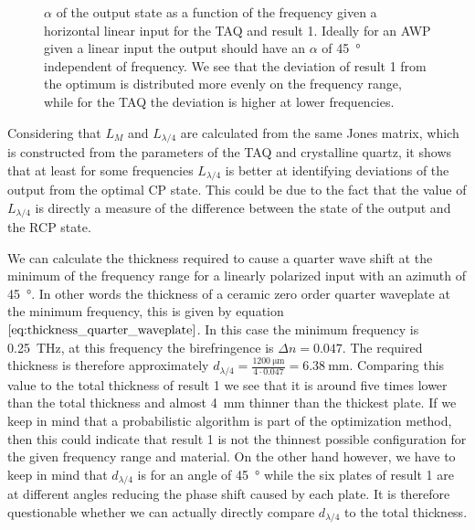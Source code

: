 \begin{figure}[H]
    \centering
    
    \caption{$\alpha$ of the output state as a function of the frequency given a horizontal linear input for the TAQ and result 1. Ideally for an AWP given a linear input the output should have an $\alpha$ of \SI{45}{\degree} independent of frequency. We see that the deviation of result 1 from the optimum is distributed more evenly on the frequency range, while for the TAQ the deviation is higher at lower frequencies.}
    \label{fig:cl4_alpha}
\end{figure}

Considering that $L_M$ and $L_{\lambda/4}$ are calculated from the same Jones matrix, which is constructed from the parameters of the TAQ and crystalline quartz, it shows that at least for some frequencies $L_{\lambda/4}$ is better at identifying deviations of the output from the optimal CP state. This could be due to the fact that the value of $L_{\lambda/4}$ is directly a measure of the difference between the state of the output and the RCP state.

We can calculate the thickness required to cause a quarter wave shift at the minimum of the frequency range for a linearly polarized input with an azimuth of \SI{45}{\degree}. In other words the thickness of a ceramic zero order quarter waveplate at the minimum frequency, this is given by equation $\ref{eq:thickness_quarter_waveplate}$. In this case the minimum frequency is \SI{0.25}{\tera \hertz}, at this frequency the birefringence is $\Delta n = 0.047$. The required thickness is therefore approximately $d_{\lambda/4}=\frac{\SI{1200}{\micro \meter}}{4\cdot0.047}=\SI{6.38}{\milli \meter}$. Comparing this value to the total thickness of result 1 we see that it is around five times lower than the total thickness and almost \SI{4}{\milli \meter} thinner than the thickest plate. If we keep in mind that a probabilistic algorithm is part of the optimization method, then this could indicate that result 1 is not the thinnest possible configuration for the given frequency range and material. On the other hand however, we have to keep in mind that $d_{\lambda/4}$ is for an angle of \SI{45}{\degree} while the six plates of result 1 are at different angles reducing the phase shift caused by each plate. It is therefore questionable whether we can actually directly compare $d_{\lambda/4}$ to the total thickness. 

